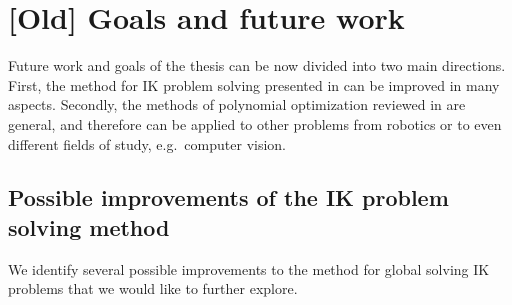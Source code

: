\chapter{[Old] Goals and future work}
Future work and goals of the thesis can be now divided into two main directions.
First, the method for IK problem solving presented in  can be improved in many aspects.
Secondly, the methods of polynomial optimization reviewed in  are general, and therefore can be applied to other problems from robotics or to even different fields of study, e.g.\ computer vision.

\section{Possible improvements of the IK problem solving method}
We identify several possible improvements to the method for global solving IK problems that we would like to further explore.
